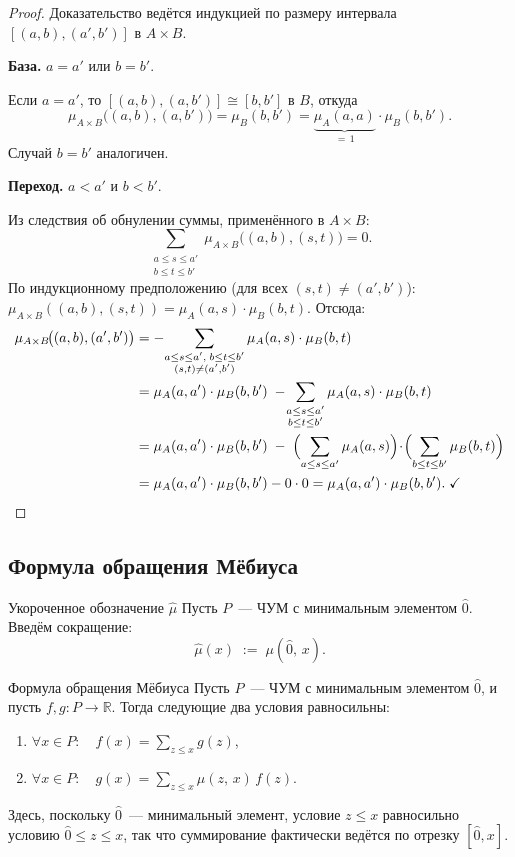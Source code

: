 \begin{proof}
	Доказательство ведётся индукцией по размеру интервала $[(a,b),(a',b')]$ в $A\times B$.
	
	\textbf{База.} $a = a'$ или $b = b'$.
	
	Если $a = a'$, то $[(a,b),(a,b')] \cong [b,b']$ в $B$, откуда
	\[
	\mu_{A\times B}\!\bigl((a,b),(a,b')\bigr)
	= \mu_B(b,b')
	= \underbrace{\mu_A(a,a)}_{=\,1}\cdot\mu_B(b,b').
	\]
	Случай $b = b'$ аналогичен.\;\checkmark
	
	\textbf{Переход.} $a < a'$ и $b < b'$.
	
	Из следствия об обнулении суммы, применённого в $A\times B$:
	\[
	\sum_{\substack{a \leq s \leq a' \\ b \leq t \leq b'}}
	\mu_{A\times B}\!\bigl((a,b),(s,t)\bigr) = 0.
	\]
	По индукционному предположению (для всех $(s,t)\neq(a',b')$):
	$\mu_{A\times B}((a,b),(s,t)) = \mu_A(a,s)\cdot\mu_B(b,t)$.
	Отсюда:
	\begin{align*}
		\mu_{A\times B}\!\bigl((a,b),(a',b')\bigr)
		&= -\!\sum_{\substack{a\leq s\leq a',\;b\leq t\leq b'\\(s,t)\neq(a',b')}}
		\mu_A(a,s)\cdot\mu_B(b,t)\\
		&= \mu_A(a,a')\cdot\mu_B(b,b')
		\;-\!\sum_{\substack{a\leq s\leq a'\\b\leq t\leq b'}}
		\mu_A(a,s)\cdot\mu_B(b,t)\\
		&= \mu_A(a,a')\cdot\mu_B(b,b')
		\;-\;\Bigl(\sum_{a\leq s\leq a'}\mu_A(a,s)\Bigr)
		\!\cdot\!\Bigl(\sum_{b\leq t\leq b'}\mu_B(b,t)\Bigr)\\
		&= \mu_A(a,a')\cdot\mu_B(b,b') - 0\cdot 0
		= \mu_A(a,a')\cdot\mu_B(b,b').\;\checkmark
	\end{align*}
\end{proof}

\subsection{Формула обращения Мёбиуса}

\begin{Definition}{Укороченное обозначение $\hat{\mu}$}{}
	Пусть $P$~--- ЧУМ с минимальным элементом $\hat{0}$. Введём сокращение:
	\[
	\hat{\mu}(x) \;:=\; \mu(\hat{0},\, x).
	\]
\end{Definition}

\begin{Theorem}{Формула обращения Мёбиуса}{}
	Пусть $P$~--- ЧУМ с минимальным элементом $\hat{0}$, и пусть $f, g \colon P \to \mathbb{R}$.
	Тогда следующие два условия равносильны:
	\begin{enumerate}
		\item $\forall x \in P\colon\quad f(x) = \displaystyle\sum_{z \leq x} g(z)$,
		\item $\forall x \in P\colon\quad g(x) = \displaystyle\sum_{z \leq x} \mu(z,\, x)\, f(z)$.
	\end{enumerate}
	
	Здесь, поскольку $\hat{0}$~--- минимальный элемент, условие $z\le x$ равносильно
	условию $\hat{0}\le z\le x$, так что суммирование фактически ведётся по отрезку
	$[\hat{0},x]$.
\end{Theorem}

